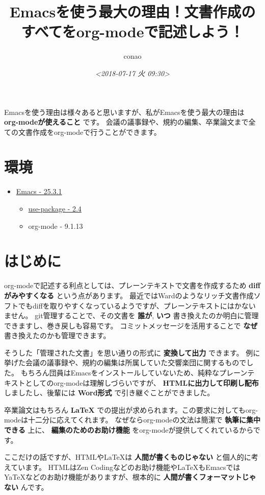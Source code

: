 \documentclass[11pt]{article}
\author{conao}
\date{\textit{<2018-07-17 火 09:30>}}
\title{Emacsを使う最大の理由！文書作成のすべてをorg-modeで記述しよう！}
\begin{document}
\maketitle
\tableofcontents

Emacsを使う理由は様々あると思いますが、私がEmacsを使う最大の理由は \textbf{org-modeが使えること} です。
会議の議事録や、規約の編集、卒業論文まで全ての文書作成をorg-modeで行うことができます。

\section{環境}
\label{sec:org71cfa91}
\begin{itemize}
\item \href{../emacs/index.org}{Emacs - 25.3.1}
\begin{itemize}
\item \href{../use-package.org}{use-package - 2.4}
\item org-mode - 9.1.13
\end{itemize}
\end{itemize}

\section{はじめに}
\label{sec:org75bfb36}
org-modeで記述する利点としては、プレーンテキストで文書を作成するため \textbf{diffがみやすくなる} という点があります。
最近ではWardのようなリッチ文書作成ソフトでもdiffを取りやすくなっているようですが、プレーンテキストにはかないません。
git管理することで、その文書を \textbf{誰が}, \textbf{いつ} 書き換えたのか明白に管理できますし、巻き戻しも容易です。
コミットメッセージを活用することで \textbf{なぜ} 書き換えたのかも管理できます。

そうした「管理された文書」を思い通りの形式に \textbf{変換して出力} できます。
例に挙げた会議の議事録や、規約の編集は所属していた交響楽団に関するものでした。
もちろん団員はEmacsをインストールしていないため、純粋なプレーンテキストとしてのorg-modeは理解しづらいですが、
\textbf{HTMLに出力して印刷し配布} しましたし、後輩には \textbf{Word形式} で引き継ぐことができました。

卒業論文はもちろん \textbf{\LaTeX{}} での提出が求められます。この要求に対してもorg-modeは十二分に応えてくれます。
なぜならorg-modeの文法は簡潔で \textbf{執筆に集中できる} 上に、 \textbf{編集のためのお助け機能} をorg-modeが提供してくれているからです。

ここだけの話ですが、HTMLや\LaTeX{}は \textbf{人間が書くものじゃない} と個人的に考えています。
HTMLはZen Codingなどのお助け機能や\LaTeX{}もEmacsではYaTeXなどのお助け機能がありますが、根本的に \textbf{人間が書くフォーマットじゃない} んです。
\end{document}
